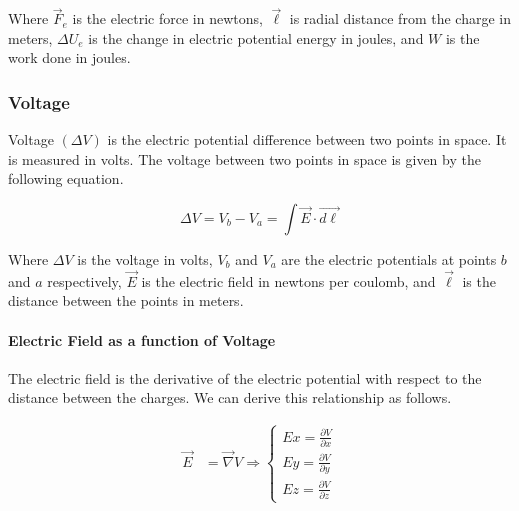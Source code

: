 Where $\vec{F}_e$ is the electric force in newtons, $\vec{\ell}$ is radial distance from the charge in meters, $\Delta{U_e}$ is the change
in electric potential energy in joules, and $W$ is the work done in joules.

\subsubsection*{Voltage}
Voltage $(\Delta V)$ is the electric potential difference between two points in space. It is measured in volts. The voltage between two points in space is given by the following equation.

\begin{equation*}
    \Delta V = V_b - V_a = \int \vec{E} \cdot \vec{d\ell}
\end{equation*}

Where $\Delta V$ is the voltage in volts, $V_b$ and $V_a$ are the electric potentials at points $b$ and $a$ respectively, $\vec{E}$ is the electric field in newtons per coulomb, 
and $\vec{\ell}$ is the distance between the points in meters.

\paragraph*{Electric Field as a function of Voltage}
The electric field is the derivative of the electric potential with respect to the distance between the charges. We can derive this relationship as follows.

\begin{align*}
    \vec{E} &= \vec{\nabla}V
    \Longrightarrow
    \begin{cases}
        Ex = \frac{\partial V}{\partial x}\\
        Ey = \frac{\partial V}{\partial y}\\
        Ez = \frac{\partial V}{\partial z}
    \end{cases}
\end{align*}